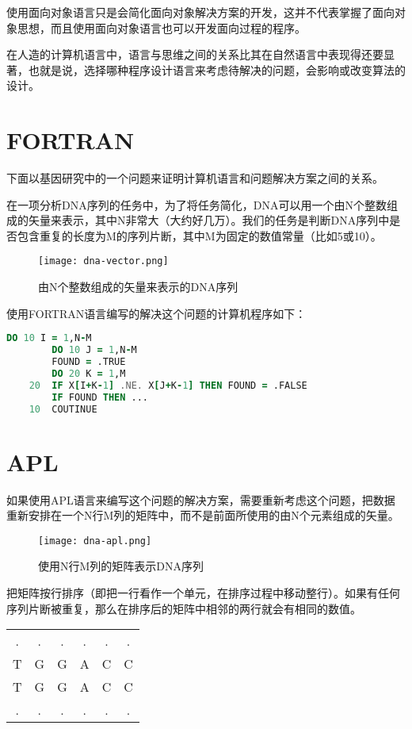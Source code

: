 使用面向对象语言只是会简化面向对象解决方案的开发，这并不代表掌握了面向对象思想，而且使用面向对象语言也可以开发面向过程的程序。


在人造的计算机语言中，语言与思维之间的关系比其在自然语言中表现得还要显著，也就是说，选择哪种程序设计语言来考虑待解决的问题，会影响或改变算法的设计。

\section{FORTRAN}


下面以基因研究中的一个问题来证明计算机语言和问题解决方案之间的关系。

在一项分析DNA序列的任务中，为了将任务简化，DNA可以用一个由N个整数组成的矢量来表示，其中N非常大（大约好几万）。我们的任务是判断DNA序列中是否包含重复的长度为M的序列片断，其中M为固定的数值常量（比如5或10）。


\begin{figure}[htbp]
\centering
\texttt{[image: dna-vector.png]}
\caption{由N个整数组成的矢量来表示的DNA序列}
\label{fig:dna-vector}
\end{figure}

使用FORTRAN语言编写的解决这个问题的计算机程序如下：

\begin{lstlisting}[language=Fortran]
		DO 10 I = 1,N-M
		DO 10 J = 1,N-M
		FOUND = .TRUE
		DO 20 K = 1,M
	20	IF X[I+K-1] .NE. X[J+K-1] THEN FOUND = .FALSE
		IF FOUND THEN ...
	10	COUTINUE
\end{lstlisting}

\section{APL}


如果使用APL语言来编写这个问题的解决方案，需要重新考虑这个问题，把数据重新安排在一个N行M列的矩阵中，而不是前面所使用的由N个元素组成的矢量。

\begin{figure}[htbp]
\centering
\texttt{[image: dna-apl.png]}
\caption{使用N行M列的矩阵表示DNA序列}
\label{fig:dna-apl}
\end{figure}

把矩阵按行排序（即把一行看作一个单元，在排序过程中移动整行）。如果有任何序列片断被重复，那么在排序后的矩阵中相邻的两行就会有相同的数值。

\begin{table}[htb]
\centering
\begin{tabular}{cccccc}
.&	.&	.&.	&.	&.	\\
T	&G	&G	&A	&C	&C\\
T	&G	&G	&A	&C	&C\\
.&	.&.	&.	&.	&.	\\
\end{tabular}
\end{table}


